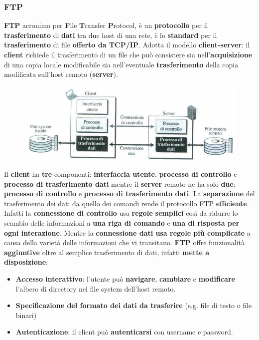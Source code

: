 \documentclass[11pt,a4paper]{article}
\theoremstyle{definition}
\begin{document}
\subsubsection{FTP}
\label{sec:FTP}
\textbf{FTP} acronimo per \textbf{F}ile \textbf{T}ransfer \textbf{P}rotocol, è un \textbf{protocollo} per il \textbf{trasferimento} di \textbf{dati} tra due host di una rete, è lo \textbf{standard} per il \textbf{trasferimento} di file \textbf{offerto da TCP/IP}. Adotta il modello \textbf{client-server}: il \textbf{client} richiede il trasferimento di un file che può consistere sia nell'\textbf{acquisizione} di una copia locale modificabile sia nell'eventuale \textbf{trasferimento} della copia modificata sull'host remoto (\textbf{server}).
\begin{figure}[!h]
	\includegraphics[scale=0.4]{Immagini/FTP.png}
	\centering
\end{figure}\newline
Il \textbf{client} ha \textbf{tre} componenti: \textbf{interfaccia utente}, \textbf{processo di controllo} e \textbf{processo di trasferimento dati} mentre il \textbf{server} remoto ne ha solo \textbf{due}: \textbf{processo di controllo} e \textbf{processo di trasferimento dati}. La \textbf{separazione} del trasferimento dei dati da quello dei comandi rende il protocollo FTP \textbf{efficiente}. Infatti la \textbf{connessione di controllo} usa \textbf{regole semplici} così da ridurre lo scambio delle informazioni a \textbf{una riga di comando} e \textbf{una di risposta per ogni interazione}. Mentre la \textbf{connessione dati usa regole più complicate} a causa della varietà delle informazioni che vi transitano.
\textbf{FTP} offre funzionalità \textbf{aggiuntive} oltre al semplice trasferimento di dati, infatti \textbf{mette a disposizione}:
\begin{itemize}
	\item \textbf{Accesso interattivo}: l’utente può \textbf{navigare}, \textbf{cambiare} e \textbf{modificare} l’albero di directory nel file system dell'host remoto.
	\item \textbf{Specificazione del formato dei dati da trasferire} (e.g. file di testo o file binari)
	\item \textbf{Autenticazione}: il client può \textbf{autenticarsi} con username e password.
\end{itemize}
\end{document}
